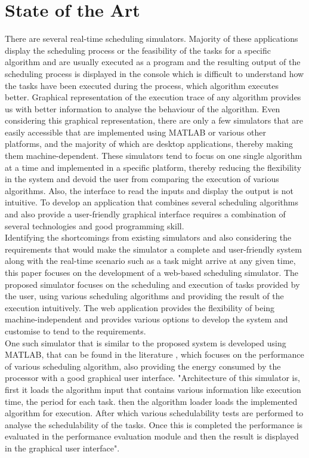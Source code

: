 \documentclass[12pt, conference]{IEEEtran}
\begin{document}
\section{State of the Art}
There are several real-time scheduling simulators. Majority of these applications display the scheduling process or the feasibility of the tasks for a specific algorithm and are usually executed as a program and the resulting output of the scheduling process is displayed in the console which is difficult to understand how the tasks have been executed during the process, which algorithm executes better. Graphical representation of the execution trace of any algorithm provides us with better information to analyse the behaviour of the algorithm. Even considering this graphical representation, there are only a few simulators that are easily accessible that are implemented using MATLAB or various other platforms, and the majority of which are desktop applications, thereby making them machine-dependent. These simulators tend to focus on one single algorithm at a time and implemented in a specific platform, thereby reducing the flexibility in the system and devoid the user from comparing the execution of various algorithms. Also, the interface to read the inputs and display the output is not intuitive. To develop an application that combines several scheduling algorithms and also provide a user-friendly graphical interface requires a combination of several technologies and good programming skill.\\
Identifying the shortcomings from existing simulators and also considering the requirements that would make the simulator a complete and user-friendly system along with the real-time scenario such as a task might arrive at any given time, this paper focuses on the development of a web-based scheduling simulator. The proposed simulator focuses on the scheduling and execution of tasks provided by the user, using various scheduling algorithms and providing the result of the execution intuitively. The web application provides the flexibility of being machine-independent and provides various options to develop the system and customise to tend to the requirements.\\
One such simulator that is similar to the proposed system is developed using MATLAB, that can be found in the literature \cite{b1}, which focuses on the performance of various scheduling algorithm, also providing the energy consumed by the processor with a good graphical user interface. "Architecture of this simulator is, first it loads the algorithm input that contains various information like execution time, the period for each task. then the algorithm loader loads the implemented algorithm for execution. After which various schedulability tests are performed to analyse the schedulability of the tasks. Once this is completed the performance is evaluated in the performance evaluation module and then the result is displayed in the graphical user interface"\cite{b1}.
\end{document}
